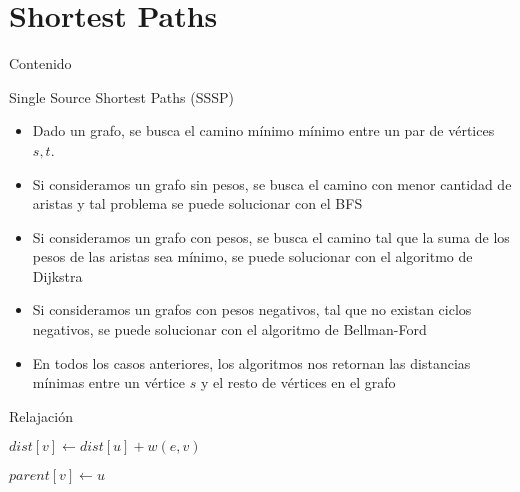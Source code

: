 \documentclass[handout]{beamer}
\begin{document}
\section{Shortest Paths}
\begin{frame}{Contenido}
\tableofcontents[currentsection]
\end{frame}

\begin{frame}{Single Source Shortest Paths (SSSP)}
 \begin{itemize}
   \item Dado un grafo, se busca el camino m\'inimo m\'inimo entre un par de v\'ertices $s, t$.
      \pause
    \item Si consideramos un grafo sin pesos, se busca el camino con menor cantidad de aristas y tal problema se puede solucionar con el BFS
      \pause
    \item Si consideramos un grafo con pesos, se busca el camino tal que la suma de los pesos de las aristas sea m\'inimo, se puede solucionar con el algoritmo de Dijkstra
      \pause
    \item Si consideramos un grafos con pesos negativos, tal que no existan ciclos negativos, se puede solucionar con el algoritmo de Bellman-Ford
      \pause
    \item En todos los casos anteriores, los algoritmos nos retornan las distancias m\'inimas entre un v\'ertice $s$ y el resto de v\'ertices en el grafo
  \end{itemize}
\end{frame}

\begin{frame}{Relajaci\'on}
  \begin{algorithm}[H]
    \BlankLine
    {
      $dist[v] \leftarrow dist[u] + w(e,v)$

      $parent[v] \leftarrow u $

    }
    \BlankLine
  \end{algorithm}
\end{frame}
\end{document}
